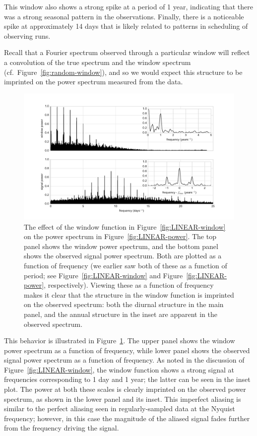 \documentclass[preprint]{aastex}
\newcommand{\fig}[1]{Figure~\ref{fig:#1}}
\newcommand{\figlabel}[1]{\label{fig:#1}}
\begin{document}
This window also shows a strong spike at a period of 1 year, indicating that
there was a strong seasonal pattern in the observations.
Finally, there is a noticeable spike at approximately 14 days that is likely
related to patterns in scheduling of observing runs.

Recall that a Fourier spectrum observed through a particular window will reflect
a convolution of the true spectrum and the window spectrum
(cf.\ \fig{random-window}), and so we would expect this structure to be
imprinted on the power spectrum measured from the data.


\begin{figure}[ht]
  \centering
  \includegraphics[width=\textwidth]{fig15_LINEAR_window_effect}
  \caption{The effect of the window function in \fig{LINEAR-window} on the
    power spectrum in \fig{LINEAR-power}.
    The top panel shows the window power spectrum, and the bottom panel shows
    the observed signal power spectrum.
    Both are plotted as a function of frequency (we earlier saw both of these
    as a function of period; see \fig{LINEAR-window} and \fig{LINEAR-power},
    respectively).
    Viewing these as a function of frequency makes it clear that the structure
    in the window function is imprinted on the observed spectrum: both the
    diurnal structure in the main panel, and the annual structure in the inset
    are apparent in the observed spectrum.
    \figlabel{LINEAR-window-effect}}
\end{figure}

This behavior is illustrated in \fig{LINEAR-window-effect}.
The upper panel shows the window power spectrum as a function of frequency, while lower panel shows the observed signal power spectrum as a function of frequency.
As noted in the discussion of \fig{LINEAR-window}, the window function shows a strong signal at frequencies corresponding to 1 day and 1 year; the latter can be seen in the inset plot.
The power at both these scales is clearly imprinted on the observed power spectrum, as shown in the lower panel and its inset.
This imperfect aliasing is similar to the perfect aliasing seen in regularly-sampled data at the Nyquist frequency; however, in this case the magnitude of the
aliased signal fades further from the frequency driving the signal.
\end{document}
